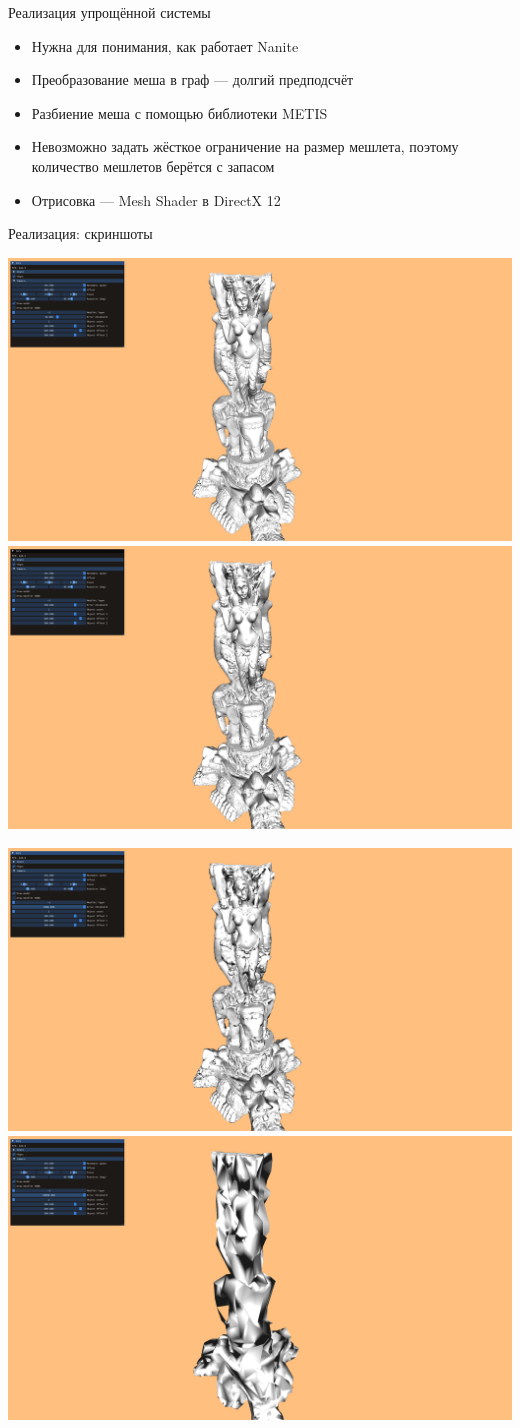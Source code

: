\begin{frame}{Реализация упрощённой системы}
    \begin{itemize}
        \item Нужна для понимания, как работает Nanite
        \item Преобразование меша в граф --- долгий предподсчёт
        \item Разбиение меша с помощью библиотеки METIS
        \item Невозможно задать жёсткое ограничение на размер мешлета, поэтому количество мешлетов берётся с запасом
        \item Отрисовка --- Mesh Shader в DirectX 12
    \end{itemize}
\end{frame}

\begin{frame}{Реализация: скриншоты}
    \begin{center}
        \includegraphics[width=.45\textwidth]{demo-0.png}
        \includegraphics[width=.45\textwidth]{demo-1.png}

        \includegraphics[width=.45\textwidth]{demo-2.png}
        \includegraphics[width=.45\textwidth]{demo-3.png}
    \end{center}
\end{frame}
